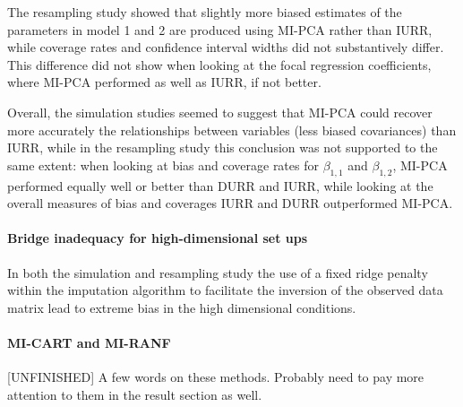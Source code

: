 	The resampling study showed that slightly more biased estimates of the parameters in model 1 and 2 are produced 
	using MI-PCA rather than IURR, while coverage rates and confidence interval widths did not substantively differ.
	This difference did not show when looking at the focal regression coefficients, where MI-PCA performed as well 
	as IURR, if not better.
	
	Overall, the simulation studies seemed to suggest that MI-PCA could recover more accurately the relationships
	between variables (less biased covariances) than IURR, while in the resampling study this conclusion was not
	supported to the same extent: when looking at bias and coverage rates for $\beta_{1,1}$ and $\beta_{1,2}$, MI-PCA 
	performed equally well or better than DURR and IURR, while looking at the overall measures of bias and coverages
	IURR and DURR outperformed MI-PCA.

\paragraph{Bridge inadequacy for high-dimensional set ups}
	In both the simulation and resampling study the use of a fixed ridge penalty within the imputation
	algorithm to facilitate the inversion of the observed data matrix lead to extreme bias in the high
	dimensional conditions.

\paragraph{MI-CART and MI-RANF}
	[UNFINISHED] A few words on these methods. Probably need to pay more attention to them in the result section as well.
